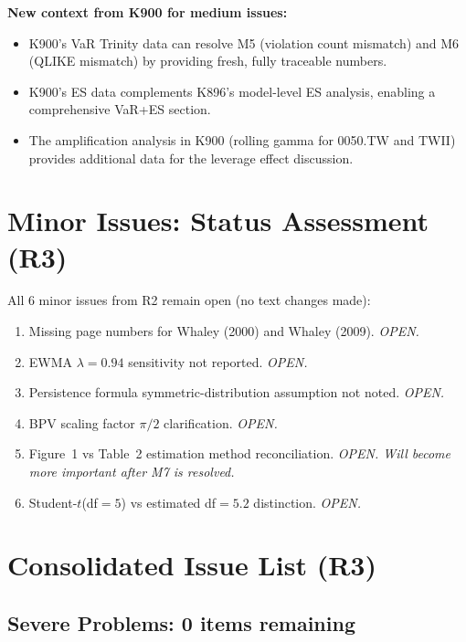 \documentclass[12pt,a4paper]{article}
\begin{document}
\noindent\textbf{New context from K900 for medium issues:}
\begin{itemize}[nosep]
\item K900's VaR Trinity data can resolve M5 (violation count mismatch) and M6 (QLIKE mismatch) by providing fresh, fully traceable numbers.
\item K900's ES data complements K896's model-level ES analysis, enabling a comprehensive VaR+ES section.
\item The amplification analysis in K900 (rolling gamma for 0050.TW and TWII) provides additional data for the leverage effect discussion.
\end{itemize}


\section*{Minor Issues: Status Assessment (R3)}

All 6 minor issues from R2 remain open (no text changes made):

\begin{enumerate}[label=m\arabic*]
\item Missing page numbers for Whaley (2000) and Whaley (2009). \textit{OPEN.}
\item EWMA $\lambda = 0.94$ sensitivity not reported. \textit{OPEN.}
\item Persistence formula symmetric-distribution assumption not noted. \textit{OPEN.}
\item BPV scaling factor $\pi/2$ clarification. \textit{OPEN.}
\item Figure~1 vs Table~2 estimation method reconciliation. \textit{OPEN. Will become more important after M7 is resolved.}
\item Student-$t$(df$=5$) vs estimated df$=5.2$ distinction. \textit{OPEN.}
\end{enumerate}


\section*{Consolidated Issue List (R3)}

\subsection*{\textcolor{okgreen}{Severe Problems: 0 items remaining}}
\end{document}

